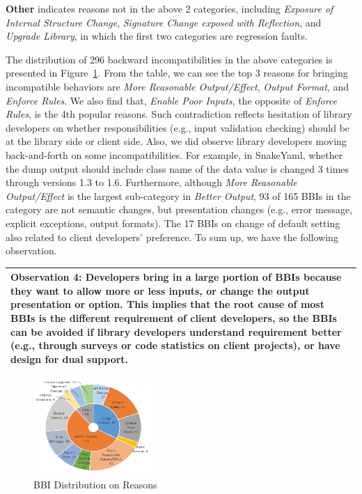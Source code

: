 \textbf{Other} indicates reasons not in the above 2 categories, including \textit{Exposure of Internal Structure Change}, \textit{Signature Change exposed with Reflection}, and \textit{Upgrade Library}, in which the first two categories are regression faults.  

The distribution of 296 backward incompatibilities in the above categories is presented in Figure~\ref{figure:reason}. From the table, we can see the top 3 reasons for bringing incompatible behaviors are \textit{More Reasonable Output/Effect}, \textit{Output Format}, and \textit{Enforce Rules}. We also find that, \textit{Enable Poor Inputs}, the opposite of \textit{Enforce Rules}, is the 4th popular reasons. Such contradiction reflects hesitation of library developers on whether responsibilities (e.g., input validation checking) should be at the library side or client side. Also, we did observe library developers moving back-and-forth on some incompatibilities. For example, in SnakeYaml, whether the dump output should include class name of the data value is changed 3 times through versions 1.3 to 1.6. Furthermore, although \textit{More Reasonable Output/Effect} is the largest sub-category in \textit{Better Output}, 93 of 165 BBIs in the category are not semantic changes, but presentation changes (e.g., error message, explicit exceptions, output formats). The 17 BBIs on change of default setting also related to client developers' preference. To sum up, we have the following observation. 

\medskip\vspace{+0.05cm}
\noindent\begin{tabular}{|p{16cm}|}
	\hline
	\textbf{Observation 4:} Developers bring in a large portion of BBIs because they want to allow more or less inputs, or change the output presentation or option. This implies that the root cause of most BBIs is the different requirement of client developers, so the BBIs can be avoided if library developers understand requirement better (e.g., through surveys or code statistics on client projects), or have design for dual support.
	\\
	\hline
\end{tabular}
\medskip

%

\begin{figure}
	\centering
	\includegraphics[width=0.4\textwidth]{backward/figs/Reason.pdf}
	
	\caption{BBI Distribution on Reasons}
	
	\label{figure:reason}
	\vspace{0.3cm}
\end{figure}

